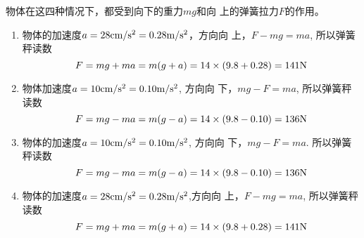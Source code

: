 \begin{enumerate}
\begin{solution}
    物体在这四种情况下，都受到向下的重力$mg$和向
上的弹簧拉力$F$的作用。
\begin{enumerate}
    \item 物体的加速度$a=28{\rm cm/s^2}=0.28\text{m}/\text{s}^2$，方向向
    上，$F-mg=ma$, 所以弹簧秤读数
   \[ F=mg+ma=m(g+a)=14\times(9.8+0.28)=141{\rm N}\]
    \item 物体加速度$a=10{\rm cm/s^2}=0.10\text{m}/\text{s}^2$, 方向向
    下，$mg-F=ma$, 所以弹簧秤读数
\[    F=mg-ma=m(g-a)=14\times(9.8-0.10)=136{\rm N}\]
    \item 物体的加速度$a=10{\rm cm/s^2}=0.10\text{m}/\text{s}^2$, 方向向
    下，$mg-F=ma$. 所以弹簧秤读数
    \[     F=mg- ma=m(g-a)=14\times(9.8-0.10)=136{\rm N}\]
    \item 物体的加速度$a=28{\rm cm/s^2}=0.28\text{m}/\text{s}^2$,方向向
    上，$F-mg=ma$, 所以弹簧秤读数
    \[     F=mg+ma=m(g+a)=14\times(9.8+0.28)=141{\rm N}\]
\end{enumerate}
\end{solution}
\end{enumerate}



